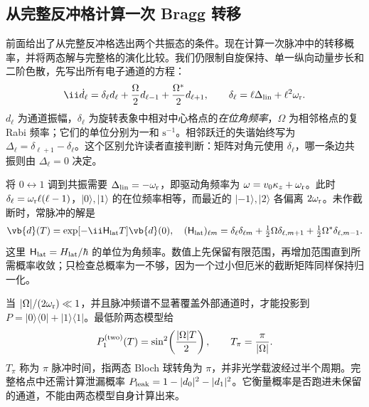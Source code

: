\subsection{从完整反冲格计算一次 Bragg 转移}
\label{sec:electron-recoil-bragg-calculation}

前面给出了从完整反冲格选出两个共振态的条件。现在计算一次脉冲中的转移概率，并将两态解与完整格的演化比较。我们仍限制自旋保持、单一纵向动量步长和二阶色散，先写出所有电子通道的方程：
\begin{equation}
 \ii\dot d_\ell=\delta_\ell d_\ell
 +\frac{\Omega}{2}d_{\ell-1}+\frac{\Omega^*}{2}d_{\ell+1},\qquad
 \delta_\ell=\ell\Delta_{\rm lin}+\ell^2\omega_{\rm r}.
 \label{eq:electron-bragg-full-lattice}
\end{equation}
$d_\ell$ 为通道振幅，$\delta_\ell$ 为旋转表象中相对中心格点的\emph{在位角频率}，$\Omega$ 为相邻格点的复 Rabi 频率；它们的单位分别为一和 $\mathrm{s^{-1}}$。相邻跃迁的失谐始终写为 $\Delta_\ell=\delta_{\ell+1}-\delta_\ell$。这个区别允许读者直接判断：矩阵对角元使用 $\delta_\ell$，哪一条边共振则由 $\Delta_\ell=0$ 决定。

将 $0\leftrightarrow1$ 调到共振需要 $\Delta_{\rm lin}=-\omega_{\rm r}$，即驱动角频率为 $\omega=v_0\kappa_z+\omega_{\rm r}$。此时 $\delta_\ell=\omega_{\rm r}\ell(\ell-1)$，$|0\rangle,|1\rangle$ 的在位频率相等，而最近的 $|-1\rangle,|2\rangle$ 各偏离 $2\omega_{\rm r}$。未作截断时，常脉冲的解是
\begin{equation*}
 \vb{d}(T)=\exp[-\ii\mathsf H_{\rm lat}T]\vb{d}(0),
 \quad (\mathsf H_{\rm lat})_{\ell m}
 =\delta_\ell\delta_{\ell m}
 +\tfrac12\Omega\delta_{\ell,m+1}
 +\tfrac12\Omega^*\delta_{\ell,m-1}.
\end{equation*}
这里 $\mathsf H_{\rm lat}=H_{\rm lat}/\hbar$ 的单位为角频率。数值上先保留有限范围，再增加范围直到所需概率收敛；只检查总概率为一不够，因为一个过小但厄米的截断矩阵同样保持归一化。

当 $|\Omega|/(2\omega_{\rm r})\ll1$，并且脉冲频谱不显著覆盖外部通道时，才能投影到 $P=|0\rangle\langle0|+|1\rangle\langle1|$。最低阶两态模型给
\begin{equation}
 P_{1}^{\rm(two)}(T)=\sin^2\!\left(\frac{|\Omega|T}{2}\right),\qquad
 T_\pi=\frac{\pi}{|\Omega|}.
 \label{eq:electron-bragg-pi-pulse}
\end{equation}
$T_\pi$ 称为 $\pi$ 脉冲时间，指两态 Bloch 球转角为 $\pi$，并非光学载波经过半个周期。完整格点中还需计算泄漏概率
$P_{\rm leak}=1-|d_0|^2-|d_1|^2$。它衡量概率是否跑进未保留的通道，不能由两态模型自身计算出来。

